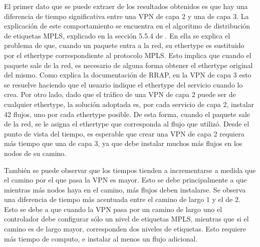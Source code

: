 El primer dato que se puede extraer de los resultados obtenidos es que hay una diferencia de tiempo significativa entre una VPN de capa 2 y una de capa 3. La explicación de este comportamiento se encuentra en el algoritmo de distribución de etiquetas MPLS, explicado en la sección 5.5.4 de \cite{proyecto-rrap}. En ella se explica el problema de que, cuando un paquete entra a la red, su ethertype es sustituido por el ethertype correspondiente al protocolo MPLS. Esto implica que cuando el paquete sale de la red, es necesario de alguna forma obtener el ethertype original del mismo. Como explica la documentación de RRAP, en la VPN de capa 3 esto se resuelve haciendo que el usuario indique el ethertype del servicio cuando lo crea. Por otro lado, dado que el tráfico de una VPN de capa 2 puede ser de cualquier ethertype, la solución adoptada es, por cada servicio de capa 2, instalar 42 flujos, uno por cada ethertype posible. De esta forma, cuando el paquete sale de la red, se le asigna el ethertype que corresponda al flujo que utilizó. Desde el punto de vista del tiempo, es esperable que crear una VPN de capa 2 requiera más tiempo que una de capa 3, ya que debe instalar muchos más flujos en los nodos de su camino.

También se puede observar que los tiempos tienden a incrementarse a medida que el camino por el que pasa la VPN es mayor. Esto se debe principalmente a que mientras más nodos haya en el camino, más flujos deben instalarse. Se observa una diferencia de tiempo más acentuada entre el camino de largo 1 y el de 2. Esto se debe a que cuando la VPN pasa por un camino de largo uno el controlador debe configurar sólo un nivel de etiquetas MPLS, mientras que si el camino es de largo mayor, corresponden dos niveles de etiquetas. Esto requiere más tiempo de computo, e instalar al menos un flujo adicional.

